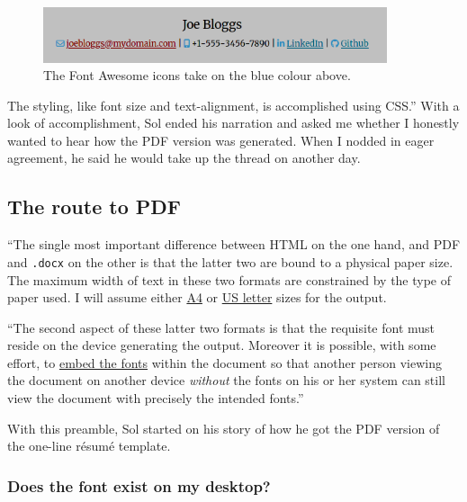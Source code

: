 \documentclass[
  british,
  a4paper,
  rgb,
  dvipsnames,
  svgnames,
  hyphens]{article}
\begin{document}
\begin{figure}
\centering
\includegraphics[width=0.9\textwidth,height=\textheight]{images/opening-html.png}
\caption{The Font Awesome icons take on the blue colour above.}
\end{figure}

The styling, like font size and text-alignment, is accomplished using
CSS.'' With a look of accomplishment, Sol ended his narration and asked
me whether I honestly wanted to hear how the PDF version was generated.
When I nodded in eager agreement, he said he would take up the thread on
another day.

\hypertarget{the-route-to-pdf}{%
\subsection{The route to PDF}\label{the-route-to-pdf}}

``The single most important difference between HTML on the one hand, and
PDF and \texttt{.docx} on the other is that the latter two are bound to
a physical paper size. The maximum width of text in these two formats
are constrained by the type of paper used. I will assume either
\href{https://en.wikipedia.org/wiki/ISO_216\#A_series}{A4} or
\href{https://en.wikipedia.org/wiki/Letter_(paper_size)}{US letter}
sizes for the output.

``The second aspect of these latter two formats is that the requisite
font must reside on the device generating the output. Moreover it is
possible, with some effort, to
\href{https://en.wikipedia.org/wiki/Font_embedding}{embed the fonts}
within the document so that another person viewing the document on
another device \emph{without} the fonts on his or her system can still
view the document with precisely the intended fonts.''

With this preamble, Sol started on his story of how he got the PDF
version of the one-line résumé template.

\hypertarget{does-the-font-exist-on-my-desktop}{%
\subsubsection{Does the font exist on my
desktop?}\label{does-the-font-exist-on-my-desktop}}
\end{document}
